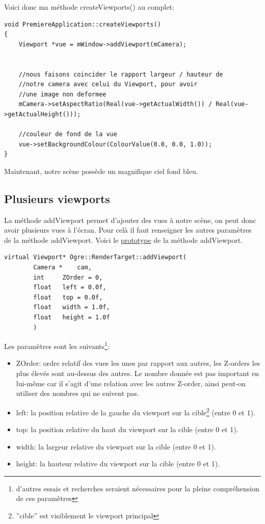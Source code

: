 \documentclass[10pt,a4paper]{report}
\begin{document}
Voici donc ma m\'ethode createViewports() au complet:
\begin{lstlisting}[caption={Cr\'eation d'un viewport}]
void PremiereApplication::createViewports()
{
    Viewport *vue = mWindow->addViewport(mCamera);
    
    
    //nous faisons coincider le rapport largeur / hauteur de 
    //notre camera avec celui du Viewport, pour avoir 
    //une image non deformee
    mCamera->setAspectRatio(Real(vue->getActualWidth()) / Real(vue->getActualHeight()));
    
    //couleur de fond de la vue
    vue->setBackgroundColour(ColourValue(0.0, 0.0, 1.0));
}
\end{lstlisting}


Maintenant, notre sc\`ene poss\`ede un magnifique ciel fond bleu.









\subsection{Plusieurs viewports}
La m\'ethode addViewport permet d'ajouter des vues \`a notre sc\`ene, on peut donc avoir plusieurs vues \`a l'\'ecran. Pour cel\`a il faut renseigner les autres param\`etres de la m\'ethode addViewport.\newline
Voici le \href{http://www.ogre3d.org/docs/api/1.9/classOgre_1_1RenderTarget.html#a1a558e64db9dfd7cc4cec4547fca0e39}{prototype} de la m\'ethode addViewport.


\begin{lstlisting}[caption={Prototype de addViewport}]
virtual Viewport* Ogre::RenderTarget::addViewport(
	 	Camera *  	cam,
		int  	ZOrder = 0,
		float  	left = 0.0f,
		float  	top = 0.0f,
		float  	width = 1.0f,
		float  	height = 1.0f 
		) 
\end{lstlisting}

Les param\`etres sont les suivants\footnote{d'autres essais et recherches seraient n\'ecessaires pour la pleine compr\'ehension de ces param\`etres}:
\begin{itemize}
\item ZOrder: ordre relatif des vues les unes par rapport aux autres, les Z-orders les plus \'elev\'es sont au-dessus des autres. Le nombre donn\'ee est pas important en lui-m\^eme car il s'agit d'une relation avec les autres Z-order, ainsi peut-on utiliser des nombres qui ne suivent pas.
\item left: la position relative de la gauche du viewport sur la cible\footnote{''cible'' est visiblement le viewport principal} (entre 0 et 1).
\item top: la position relative du haut du viewport sur la cible (entre 0 et 1).
\item width: la largeur relative du viewport sur la cible (entre 0 et 1).
\item height: la hauteur relative du viewport sur la cible (entre 0 et 1).
\end{itemize}
\end{document}
